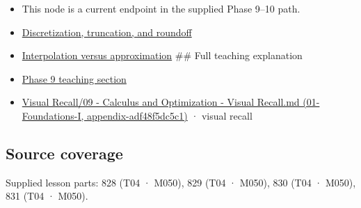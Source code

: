 \begin{itemize}
\item
  This node is a current endpoint in the supplied Phase 9--10 path.
\item
  \hyperref[appendix-6b0648b2b8e8]{Discretization, truncation, and roundoff}
\item
  \hyperref[appendix-0c2a5f69851e]{Interpolation versus approximation} \#\# Full teaching explanation
\item
  \hyperref[02-foundations-ii-ch021-jacobians-curvature-and-local-approximation]{Phase 9 teaching section}
\item
  \href{../01-Foundations-I/main.pdf\#nameddest=appendix-adf48f5dc5c1}{Visual Recall/09 - Calculus and Optimization - Visual Recall.md (01-Foundations-I, appendix-adf48f5dc5c1)} · visual recall
\end{itemize}

\subsection{Source coverage}\label{appendix-32f39e9a3738-source-coverage}

Supplied lesson parts: 828 (T04 · M050), 829 (T04 · M050), 830 (T04 · M050), 831 (T04 · M050).
